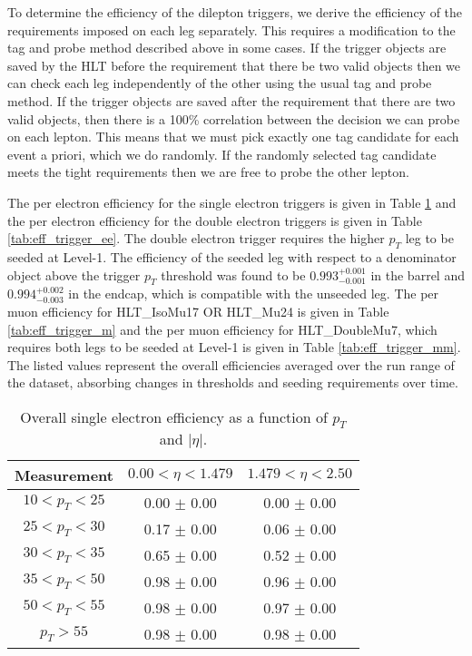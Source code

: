  
To determine the efficiency of the dilepton triggers, 
we derive the efficiency of the requirements imposed on each leg separately.
This requires a modification to the tag and probe method described above in some cases.
If the trigger objects are saved by the HLT before the requirement that there be two valid objects then
we can check each leg independently of the other using the usual tag and probe method.
If the trigger objects are saved after the requirement that there are two valid objects, then there is 
a 100\% correlation between the decision we can probe on each lepton.
This means that we must pick exactly one tag candidate for each event a priori, which we do 
randomly. 
If the randomly selected tag candidate meets the tight requirements then we are free to 
probe the other lepton.

The per electron efficiency for the single electron triggers
is given in Table \ref{tab:eff_trigger_e}
and the per electron efficiency for the double electron triggers
is given in Table \ref{tab:eff_trigger_ee}. 
The double electron trigger requires the higher $p_T$ leg to be seeded at Level-1.
The efficiency of the seeded leg with respect to a denominator object above the
trigger $p_T$ threshold was found to be $0.993^{+0.001}_{-0.001}$ in the barrel and
$0.994^{+0.002}_{-0.003}$ in the endcap, which is compatible with the unseeded leg.
The per muon efficiency for
HLT\_IsoMu17 OR HLT\_Mu24
is given in Table \ref{tab:eff_trigger_m}
and the per muon efficiency for HLT\_DoubleMu7, which requires both legs to be seeded
at Level-1 is
given in Table \ref{tab:eff_trigger_mm}. The listed values
represent the overall efficiencies averaged over the run range
of the dataset, absorbing changes in thresholds and seeding requirements
over time.
\vspace{10pt}
\begin{table}[!ht]
\begin{center}
\begin{tabular}{c|c|c}
\hline
Measurement  & $0.00<\eta<1.479$  & $1.479<\eta<2.50$  \\ 
\hline
$  10<p_T<  25$ & 0.00 $\pm$ 0.00  & 0.00 $\pm$ 0.00  \\ \hline 
$  25<p_T<  30$ & 0.17 $\pm$ 0.00  & 0.06 $\pm$ 0.00  \\ \hline 
$  30<p_T<  35$ & 0.65 $\pm$ 0.00  & 0.52 $\pm$ 0.00  \\ \hline 
$  35<p_T<  50$ & 0.98 $\pm$ 0.00  & 0.96 $\pm$ 0.00  \\ \hline 
$  50<p_T<  55$ & 0.98 $\pm$ 0.00  & 0.97 $\pm$ 0.00  \\ \hline 
$  p_T>     55$ & 0.98 $\pm$ 0.00  & 0.98 $\pm$ 0.00  \\ \hline 
\end{tabular}
\caption{Overall single electron efficiency as a function of $p_T$ and $|\eta|$.}
\label{tab:eff_trigger_e}
\end{center}
\end{table}
